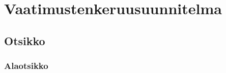\chapter{Vaatimustenkeruusuunnitelma} %
\label{keruu} %
\thispagestyle{fancy} %

\lipsum[1]

\section{Otsikko}  %

\lipsum

\subsection{Alaotsikko}

\lipsum[1-3]
